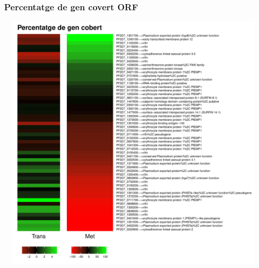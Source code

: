 \documentclass{article}\usepackage[]{graphicx}\usepackage[]{color}
\newenvironment{knitrout}{}{} %
\begin{document}
\subsubsection{Percentatge de gen covert ORF}
\begin{knitrout}
\color{fgcolor}

{\centering \includegraphics[width=20cm,height=12.5cm]{figure/minimal-met_percet_ORF-1} 

}



\end{knitrout}
\clearpage
\end{document}
